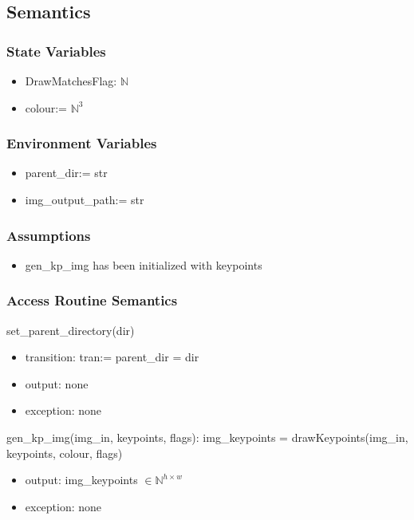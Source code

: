 \documentclass[12pt, titlepage]{article}
\begin{document}
\subsection{Semantics}

\subsubsection{State Variables}
\begin{itemize}
  \item DrawMatchesFlag: $\mathbb{N}$
  \item colour:= $\mathbb{N}^{3}$
\end{itemize}


\subsubsection{Environment Variables}
\begin{itemize}
  \item parent\_dir:= str
  \item img\_output\_path:= str
\end{itemize}

\subsubsection{Assumptions}
\begin{itemize}
  \item gen\_kp\_img has been initialized with keypoints
\end{itemize}


\subsubsection{Access Routine Semantics}

\noindent set\_parent\_directory(dir)
\begin{itemize}
  \item transition: tran:= parent\_dir = dir
  \item output: none
  \item exception: none
\end{itemize}


\noindent gen\_kp\_img(img\_in, keypoints, flags):\newline
img\_keypoints = drawKeypoints(img\_in, keypoints, colour, flags)
\begin{itemize}
  \item output: img\_keypoints $\in \mathbb{N}^{h \times w}$
  \item exception: none
\end{itemize}
\end{document}
